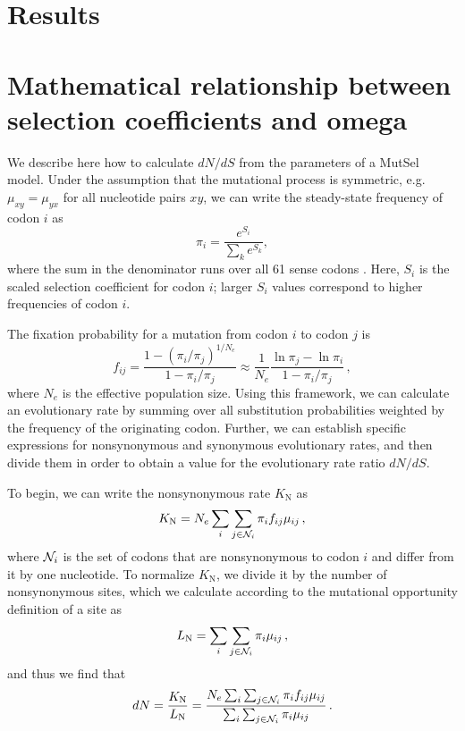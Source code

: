 \documentclass[11pt]{article}
\begin{document}
\section*{Results}


\section*{Mathematical relationship between selection coefficients and omega}


We describe here how to calculate $dN/dS$ from the parameters of a MutSel model. Under the assumption that the mutational process is symmetric, e.g. $\mu_{xy}=\mu_{yx}$ for all nucleotide pairs $xy$, we can write the steady-state frequency of codon $i$ as 
\begin{equation}\label{eq:pi_i}
 \pi_i=\frac{e^{S_i}}{\sum_k e^{S_k}},
\end{equation}
where the sum in the denominator runs over all 61 sense codons \cite{SellaHirsh2005}. Here, $S_i$ is the scaled selection coefficient for codon $i$; larger $S_i$ values correspond to higher frequencies of codon $i$.

The fixation probability for a mutation from codon $i$ to codon $j$ is \cite{HalpernBruno1998,SellaHirsh2005}
\begin{equation}\label{eq:f_ij}
 f_{ij} = \frac{1-(\pi_i/\pi_j)^{1/N_e}}{1-\pi_i/\pi_j}
  \approx \frac{1}{N_e} \frac{\ln \pi_j - \ln \pi_i}{1-\pi_i/\pi_j}\,,
\end{equation}
where $N_e$ is the effective population size. Using this framework, we can calculate an evolutionary rate by summing over all substitution probabilities weighted by the frequency of the originating codon. Further, we can establish specific expressions for nonsynonymous and synonymous evolutionary rates, and then divide them in order to obtain a value for the evolutionary rate ratio $dN/dS$.

To begin, we can write the nonsynonymous rate $K_\text{N}$ as 
\begin{equation}\label{eq:KN}
  K_\text{N} = N_e \sum_i \sum_{j \in {\cal N}_i} \pi_i  f_{ij}\mu_{ij}\,,
\end{equation}
where ${\cal N}_i$ is the set of codons that are nonsynonymous to codon $i$ and differ from it by one nucleotide. To normalize $K_\text{N}$, we divide it by the number of nonsynonymous sites, which we calculate according to the mutational opportunity definition of a site \cite{GoldmanYang1994, Yang2006} as 
\begin{equation}\label{eq:LN}
  L_\text{N} = \sum_i \sum_{j \in {\cal N}_i} \pi_i \mu_{ij}\,, 
\end{equation} and thus we find that 
\begin{equation}\label{eq:dN}
  dN = \frac{K_\text{N}}{L_\text{N}}=\frac{ N_e \sum_i \sum_{j \in {\cal N}_i} \pi_i f_{ij} \mu_{ij} } {\sum_i \sum_{j \in {\cal N}_i} \pi_i \mu_{ij} }\,.
\end{equation}
\end{document}
